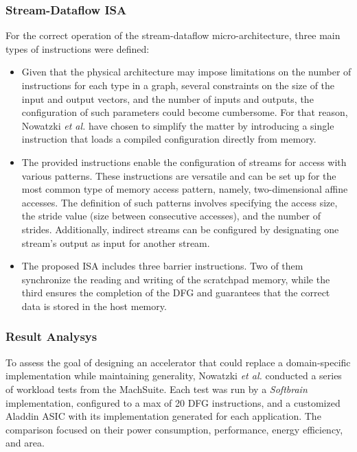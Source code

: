 \subsubsection{Stream-Dataflow ISA}
For the correct operation of the stream-dataflow micro-architecture, three main types of instructions were defined:
\begin{itemize}
    \item[]  Given that the physical architecture may impose limitations on the number of instructions for each type in a graph, several constraints on the size of the input and output vectors, and the number of inputs and outputs, the configuration of such parameters could become cumbersome. For that reason, Nowatzki \textit{et al.} \cite{8192490} have chosen to simplify the matter by introducing a single instruction that loads a compiled configuration directly from memory.
    
    \item[]  The provided instructions enable the configuration of streams for access with various patterns. These instructions are versatile and can be set up for the most common type of memory access pattern, namely, two-dimensional affine accesses. The definition of such patterns involves specifying the access size, the stride value (size between consecutive accesses), and the number of strides. Additionally, indirect streams can be configured by designating one stream's output as input for another stream.
    
    \item[]  The proposed \acrfull{ISA} includes three barrier instructions. Two of them synchronize the reading and writing of the scratchpad memory, while the third ensures the completion of the \acrfull{DFG} and guarantees that the correct data is stored in the host memory.
\end{itemize}

\subsubsection{Result Analysys}

To assess the goal of designing an accelerator that could replace a domain-specific implementation while maintaining generality, Nowatzki \textit{et al.} \cite{8192490} conducted a series of workload tests from the MachSuite. Each test was run by a \textit{Softbrain} implementation, configured to a max of 20 DFG instructions, and a customized Aladdin ASIC with its implementation generated for each application. %
The comparison focused on their power consumption, performance, energy efficiency, and area.

